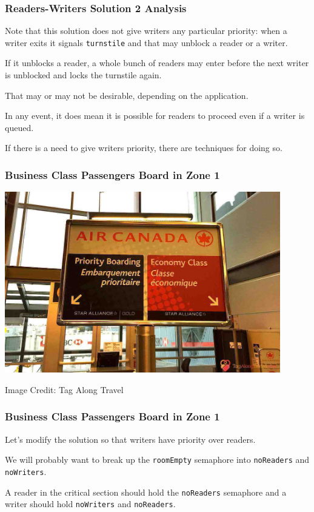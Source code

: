 \begin{frame}
	\frametitle{Readers-Writers Solution 2 Analysis}

	Note that this solution does not give writers any particular priority: when a writer exits it signals \texttt{turnstile} and that may unblock a reader or a writer.

	If it unblocks a reader, a whole bunch of readers may enter before the next writer is unblocked and locks the turnstile again.

	That may or may not be desirable, depending on the application.

	In any event, it does mean it is possible for readers to proceed even if a writer is queued.

	If there is a need to give writers priority, there are techniques for doing so.
\end{frame}


\begin{frame}
	\frametitle{Business Class Passengers Board in Zone 1}

	\begin{center}
		\includegraphics[width=0.9\textwidth]{images/priority-boarding.jpg}
	\end{center}
	\hfill Image Credit: Tag Along Travel
\end{frame}


\begin{frame}
	\frametitle{Business Class Passengers Board in Zone 1}

	Let's modify the solution so that writers have priority over readers.

	We will probably want to break up the \texttt{roomEmpty} semaphore into \texttt{noReaders} and \texttt{noWriters}.

	A reader in the critical section should hold the \texttt{noReaders} semaphore and a writer should hold \texttt{noWriters} and \texttt{noReaders}.

\end{frame}


